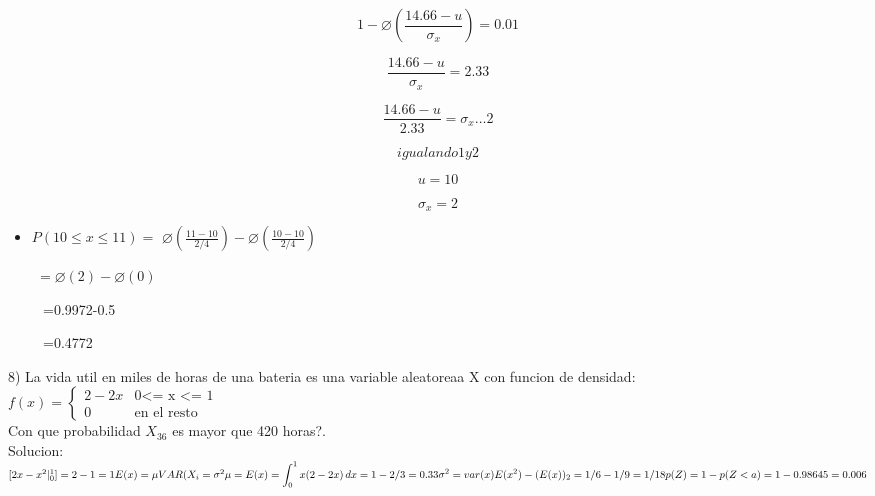\documentclass[10pt,a4paper]{article}
\begin{document}
\begin{flushleft}
\begin{multicols}{2}
	
	\vspace{\baselineskip} \[  \]  \[ 1- \varnothing  \left( \frac{14.66-u}{ \sigma _{x}} \right) =0.01 \] \par
	
	\[  \]  \[ \frac{14.66-u}{ \sigma _{x}}=2.33 \] \par
	
	\[  \]  \[ \frac{14.66-u}{2.33}= \sigma _{x} \ldots 2 \] \par
	
	\[  \]  \[ igualando 1 y 2 \] \par
	
	\[  \]  \[ u=10 \] \par
	
	\[  \]  \[  \sigma _{x}=2 \] \par
	
	
	\vspace{\baselineskip}\begin{itemize}
		\item  \( P \left( 10 \leq x \leq 11 \right) = \)   \(  \varnothing  \left( \frac{11-10}{2/4} \right) - \varnothing  \left( \frac{10-10}{2/4} \right)  \) 
	\end{itemize}\par
	
	\tabto{1.48in} \tab \ \ \ \   \( = \varnothing  \left( 2 \right) - \varnothing  \left( 0 \right)  \) \par
	
	\tabto{1.48in} \tab \ \ \ \ \  =0.9972-0.5\par
	
	\tabto{1.48in} \tab \ \ \ \ \  =0.4772\par
	
	
\end{multicols}

\vspace{\baselineskip}

8) La vida util en miles de horas de una bateria es una variable aleatoreaa X con funcion de densidad:\\
$ f(x) = \left \{ \begin{matrix} 2-2x & \mbox{0<= x <= 1 }
\\0 & \mbox{en el resto }\end{matrix}\right. $\\
Con que probabilidad $X_{36}$ es mayor que 420 horas?.\\

Solucion:\\
$ [2x -x^{2} \vert^{1}_{0}] = 2 - 1 = 1 \\
E(x) = \mu \\
VAR(X_{i} = \sigma^{2} \\
\mu = E(x)=  \displaystyle\int_{0}^{1} x(2-2x)\, dx \\
= 1 - 2/3 = 0.33 \\ 
\sigma^{2} = var(x) E(x^{2}) - (E(x))_{2} = 1/6 - 1/9 = 1/18 \\
p(Z)= 1-p(Z<a)\\ 
= 1-0.98645 = 0.006 \\ $	
\end{flushleft}
\end{document}

